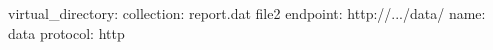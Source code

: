 virtual\_directory:
  collection:
  \- report.dat
  \- file2
  endpoint: http://.../data/
  name: data
  protocol: http
